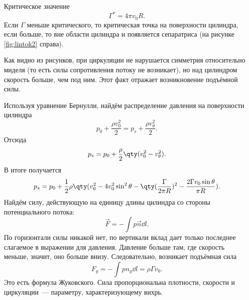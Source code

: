 Критическое значение
\begin{equation}
	\Gamma^*=4\pi v_0 R.
\end{equation}
Если $\Gamma$ меньше критического, то критическая точка на поверхности цилиндра, если больше, то вне области цилиндра и появляется сепаратриса (на рисунке \ref{fig:lintok2} справа).

Как видно из рисунков, при циркуляции не нарушается
симметрия относительно миделя (то есть силы сопротивления потоку не
возникает), но над цилиндром скорость больше, чем под ним. Этот факт отражает возникновение подъёмной силы.

Используя уравнение Бернулли, найдём распределение давления на поверхности цилиндра
\begin{equation}
	p_0+\frac{\rho v_0^2}{2}=p_s+\frac{\rho v_\theta^2}{2}.
\end{equation}
Отсюда
\begin{equation}
	p_s=p_0+\frac{\rho}{2}\qty(v_0^2-v_\theta^2).
\end{equation}
В итоге получается
\begin{equation}
	p_s=p_0+\frac12\rho\qty(v_0^2-4v_0^2\sin^2\theta-\qty(\frac{\Gamma}{2\pi R})^2-\frac{2\Gamma v_0\sin\theta}{\pi R}).
\end{equation}
Найдём силу, действующую на единицу длины цилиндра со стороны
потенциального потока:
\begin{equation}
	\vec{F}=-\int p\vec{n}\dd{l}\!.
\end{equation}
По горизонтали силы никакой нет, по вертикали вклад дает только последнее слагаемое в выражении для давления. Давление больше там, где скорость меньше, значит, оно больше внизу. Следовательно, возникает подъёмная сила
\begin{equation}
	F_y=-\int p n_y \dd{l}=\rho \Gamma v_0.
\end{equation}
Это есть формула Жуковского. Сила пропорциональна плотности, скорости  и циркуляции~--- параметру, характеризующему вихрь.

